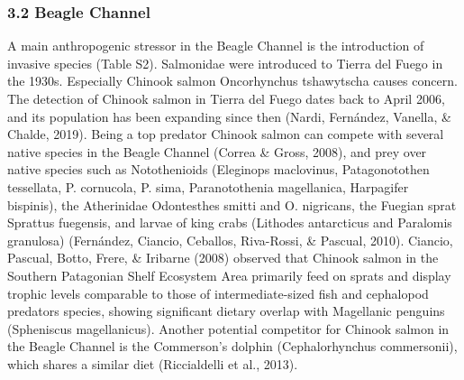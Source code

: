 \documentclass[
]{article}
\begin{document}
\hypertarget{beagle-channel}{%
\subsubsection{3.2 Beagle Channel}\label{beagle-channel}}

A main anthropogenic stressor in the Beagle Channel is the introduction
of invasive species (Table S2). Salmonidae were introduced to Tierra del
Fuego in the 1930s. Especially Chinook salmon Oncorhynchus tshawytscha
causes concern. The detection of Chinook salmon in Tierra del Fuego
dates back to April 2006, and its population has been expanding since
then (Nardi, Fernández, Vanella, \& Chalde, 2019). Being a top predator
Chinook salmon can compete with several native species in the Beagle
Channel (Correa \& Gross, 2008), and prey over native species such as
Notothenioids (Eleginops maclovinus, Patagonotothen tessellata, P.
cornucola, P. sima, Paranotothenia magellanica, Harpagifer bispinis),
the Atherinidae Odontesthes smitti and O. nigricans, the Fuegian sprat
Sprattus fuegensis, and larvae of king crabs (Lithodes antarcticus and
Paralomis granulosa) (Fernández, Ciancio, Ceballos, Riva-Rossi, \&
Pascual, 2010). Ciancio, Pascual, Botto, Frere, \& Iribarne (2008)
observed that Chinook salmon in the Southern Patagonian Shelf Ecosystem
Area primarily feed on sprats and display trophic levels comparable to
those of intermediate-sized fish and cephalopod predators species,
showing significant dietary overlap with Magellanic penguins (Spheniscus
magellanicus). Another potential competitor for Chinook salmon in the
Beagle Channel is the Commerson's dolphin (Cephalorhynchus commersonii),
which shares a similar diet (Riccialdelli et al., 2013).
\end{document}
